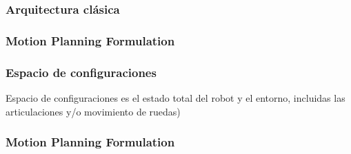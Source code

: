\begin{frame}
	\frametitle{Arquitectura clásica}
	
\end{frame}


\begin{frame}
	\frametitle{Motion Planning Formulation}
	
\end{frame}


\begin{frame}
	\frametitle{Espacio de configuraciones}
	
	
	Espacio de configuraciones es el estado total del robot y el entorno, incluidas las articulaciones y/o movimiento de ruedas)
	
\end{frame}

\begin{frame}
	\frametitle{Motion Planning Formulation}
	
\end{frame}


